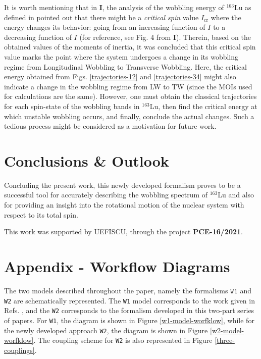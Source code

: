 \documentclass[myclassdoc,debug]{rjparticle}
\begin{document}
It is worth mentioning that in \textbf{I}, the analysis of the wobbling energy of $^{163}$Lu as defined in \cite{frauendorf2014transverse} pointed out that there might be a \emph{critical spin} value $I_\text{cr}$ where the energy changes its behavior: going from an increasing function of $I$ to a decreasing function of $I$ (for reference, see Fig. 4 from \textbf{I}). Therein, based on the obtained values of the moments of inertia, it was concluded that this critical spin value marks the point where the system undergoes a change in its wobbling regime from Longitudinal Wobbling to Transverse Wobbling. Here, the critical energy obtained from Figs. \ref{trajectories-12} and \ref{trajectories-34} might also indicate a change in the wobbling regime from LW to TW (since the MOIs used for calculations are the same). However, one must obtain the classical trajectories for each spin-state of the wobbling bands in $^{163}$Lu, then find the critical energy at which unstable wobbling occurs, and finally, conclude the actual changes. Such a tedious process might be considered as a motivation for future work.

\section{Conclusions \& Outlook}
\label{section-gata}

Concluding the present work, this newly developed formalism proves to be a successful tool for accurately describing the wobbling spectrum of $^{163}$Lu and also for providing an insight into the rotational motion of the nuclear system with respect to its total spin.

\begin{acknowledgement}
This work was supported by UEFISCU, through the project \textbf{PCE-16/2021}.
\end{acknowledgement}

\appendix
\section{Appendix - Workflow Diagrams}
\label{appendix:a}
The two models described throughout the paper, namely the formalisms $\texttt{W1}$ and \texttt{W2} are schematically represented. The \texttt{W1} model corresponds to the work given in Refs. \cite{raduta2020approach,raduta2020towards}, and the \texttt{W2} corresponds to the formalism developed in this two-part series of papers. For \texttt{W1}, the diagram is shown in Figure \ref{w1-model-worfklow}, while for the newly developed approach \texttt{W2}, the diagram is shown in Figure \ref{w2-model-worfklow}. The coupling scheme for \texttt{W2} is also represented in Figure \ref{three-couplings}.
\end{document}
